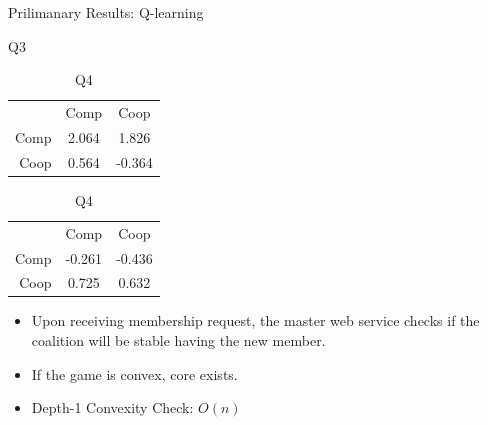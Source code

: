 \documentclass{beamer}
\begin{document}
\begin{frame}{Prilimanary Results: Q-learning}
    \begin{table}[!htb]
        \begin{minipage}{.5\linewidth}
          \caption{Q3}
          \centering
            \begin{tabular}{ r|c|c| }
                \multicolumn{1}{r}{}
                 &  \multicolumn{1}{c}{Comp}
                 & \multicolumn{1}{c}{Coop} \\
                \cline{2-3}
                Comp & 2.064 & 1.826 \\
                \cline{2-3}
                Coop & 0.564 & -0.364 \\
                \cline{2-3}
            \end{tabular}
        \end{minipage}%
        \begin{minipage}{.5\linewidth}
          \centering
            \caption{Q4}
            \begin{tabular}{ r|c|c| }
                \multicolumn{1}{r}{}
                 &  \multicolumn{1}{c}{Comp}
                 & \multicolumn{1}{c}{Coop} \\
                \cline{2-3}
                Comp & -0.261 & -0.436 \\
                \cline{2-3}
                Coop & 0.725 & 0.632 \\
                \cline{2-3}
            \end{tabular}
        \end{minipage}
    \end{table}


    \begin{itemize}
        \item Upon receiving membership request, the master web service checks if the coalition will be stable having the new member.
        \item If the game is convex, core exists.
        \item Depth-1 Convexity Check: $O(n)$
    \end{itemize}

\end{frame}

\end{document}
